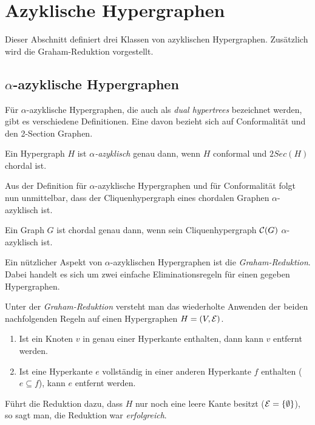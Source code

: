 \section{Azyklische Hypergraphen}

Dieser Abschnitt definiert drei Klassen von azyklischen Hypergraphen. Zusätzlich wird die Graham-Reduktion vorgestellt.

\subsection{$\alpha$-azyklische Hypergraphen}
Für $\alpha$-azyklische Hypergraphen, die auch als \emph{dual hypertrees} bezeichnet werden, gibt es verschiedene Definitionen. Eine davon bezieht sich auf Conformalität und den 2-Section Graphen.
\begin{mydef}
    Ein Hypergraph $H$ ist \emph{$\alpha$-azyklisch} genau dann, wenn $H$ conformal und $2Sec(H)$ chordal ist.
\end{mydef}

Aus der Definition für $\alpha$-azyklische Hypergraphen und für Conformalität folgt nun unmittelbar, dass der Cliquenhypergraph eines chordalen Graphen $\alpha$-azyklisch ist.

\begin{Lemma}\label{lem:ChliqueChordalAlphaAzyk}\cite[Corollary 1.3.2]{brandstaedt1999graph}
    Ein Graph $G$ ist chordal genau dann, wenn sein Cliquenhypergraph $\mathcal{C}(G)$ $\alpha$-azyklisch ist.
\end{Lemma}

Ein nützlicher Aspekt von $\alpha$-azyklischen Hypergraphen ist die \emph{Graham-Reduktion}. Dabei handelt es sich um zwei einfache Eliminationsregeln für einen gegeben Hypergraphen.

\begin{mydef}
    Unter der \emph{Graham-Reduktion} versteht man das wiederholte Anwenden der beiden nachfolgenden Regeln auf einen Hypergraphen $H = (V,\mathcal{E})$.
    \begin{enumerate}
        \item Ist ein Knoten $v$ in genau einer Hyperkante enthalten, dann kann $v$ entfernt werden.
        \item Ist eine Hyperkante $e$ vollständig in einer anderen Hyperkante $f$ enthalten ($e \subseteq f$), kann $e$ entfernt werden.
    \end{enumerate}
    
    Führt die Reduktion dazu, dass $H$ nur noch eine leere Kante besitzt ($\mathcal{E}=\{\emptyset\}$), so sagt man, die Reduktion war \emph{erfolgreich}.
\end{mydef}

